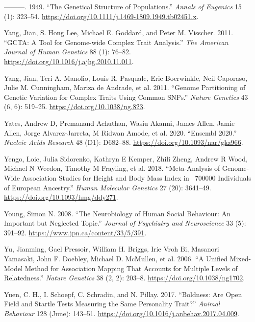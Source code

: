 \documentclass[
]{book}
\newlength{\cslhangindent}
\newlength{\cslentryspacingunit} %
\newenvironment{CSLReferences}[2] %
 {%
  \setlength{\parindent}{0pt}
  \ifodd #1
  \let\oldpar\par
  \def\par{\hangindent=\cslhangindent\oldpar}
  \fi
  \setlength{\parskip}{#2\cslentryspacingunit}
 }%
 {}
\begin{document}
\begin{CSLReferences}{1}{0}
\leavevmode{}%
---------. 1949. {``The {Genetical Structure} of {Populations}.''} \emph{Annals of Eugenics} 15 (1): 323--54. \url{https://doi.org/10.1111/j.1469-1809.1949.tb02451.x}.

\leavevmode{}%
Yang, Jian, S. Hong Lee, Michael E. Goddard, and Peter M. Visscher. 2011. {``{GCTA}: {A Tool} for {Genome-wide Complex Trait Analysis}.''} \emph{The American Journal of Human Genetics} 88 (1): 76--82. \url{https://doi.org/10.1016/j.ajhg.2010.11.011}.

\leavevmode{}%
Yang, Jian, Teri A. Manolio, Louis R. Pasquale, Eric Boerwinkle, Neil Caporaso, Julie M. Cunningham, Mariza de Andrade, et al. 2011. {``Genome Partitioning of Genetic Variation for Complex Traits Using Common {SNPs}.''} \emph{Nature Genetics} 43 (6, 6): 519--25. \url{https://doi.org/10.1038/ng.823}.

\leavevmode{}%
Yates, Andrew D, Premanand Achuthan, Wasiu Akanni, James Allen, Jamie Allen, Jorge Alvarez-Jarreta, M Ridwan Amode, et al. 2020. {``Ensembl 2020.''} \emph{Nucleic Acids Research} 48 (D1): D682--88. \url{https://doi.org/10.1093/nar/gkz966}.

\leavevmode{}%
Yengo, Loic, Julia Sidorenko, Kathryn E Kemper, Zhili Zheng, Andrew R Wood, Michael N Weedon, Timothy M Frayling, et al. 2018. {``Meta-Analysis of Genome-Wide Association Studies for Height and Body Mass Index in ~700000 Individuals of {European} Ancestry.''} \emph{Human Molecular Genetics} 27 (20): 3641--49. \url{https://doi.org/10.1093/hmg/ddy271}.

\leavevmode{}%
Young, Simon N. 2008. {``The Neurobiology of Human Social Behaviour: An Important but Neglected Topic.''} \emph{Journal of Psychiatry and Neuroscience} 33 (5): 391--92. \url{https://www.jpn.ca/content/33/5/391}.

\leavevmode{}%
Yu, Jianming, Gael Pressoir, William H. Briggs, Irie Vroh Bi, Masanori Yamasaki, John F. Doebley, Michael D. McMullen, et al. 2006. {``A Unified Mixed-Model Method for Association Mapping That Accounts for Multiple Levels of Relatedness.''} \emph{Nature Genetics} 38 (2, 2): 203--8. \url{https://doi.org/10.1038/ng1702}.

\leavevmode{}%
Yuen, C. H., I. Schoepf, C. Schradin, and N. Pillay. 2017. {``Boldness: Are Open Field and Startle Tests Measuring the Same Personality Trait?''} \emph{Animal Behaviour} 128 (June): 143--51. \url{https://doi.org/10.1016/j.anbehav.2017.04.009}.

\end{CSLReferences}
\end{document}
